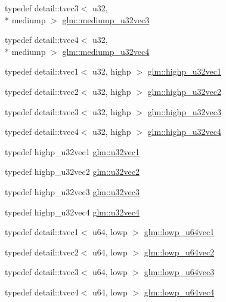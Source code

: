 \begin{DoxyCompactItemize}
\item 
typedef detail\-::tvec3$<$ u32, \\*
mediump $>$ \hyperlink{group__gtc__type__precision_ga84a903ce8834b22f78d80a64eb0181bb}{glm\-::mediump\-\_\-u32vec3}
\item 
typedef detail\-::tvec4$<$ u32, \\*
mediump $>$ \hyperlink{group__gtc__type__precision_ga532f59ac4c36a7e1371341165f7be33b}{glm\-::mediump\-\_\-u32vec4}
\item 
typedef detail\-::tvec1$<$ u32, highp $>$ \hyperlink{group__gtc__type__precision_ga8a92d1f79e2fd4a03be803e35aac8e1b}{glm\-::highp\-\_\-u32vec1}
\item 
typedef detail\-::tvec2$<$ u32, highp $>$ \hyperlink{group__gtc__type__precision_gaddb81e8e12bd640e188744ed372c95bb}{glm\-::highp\-\_\-u32vec2}
\item 
typedef detail\-::tvec3$<$ u32, highp $>$ \hyperlink{group__gtc__type__precision_gab1e386f5e415e00f800edf5d15207286}{glm\-::highp\-\_\-u32vec3}
\item 
typedef detail\-::tvec4$<$ u32, highp $>$ \hyperlink{group__gtc__type__precision_ga9418a8d549d344d4f7b7158771a2fdfe}{glm\-::highp\-\_\-u32vec4}
\item 
typedef highp\-\_\-u32vec1 \hyperlink{group__gtc__type__precision_gac8263c8c0bb36bc5c3d109f508e0fb41}{glm\-::u32vec1}
\item 
typedef highp\-\_\-u32vec2 \hyperlink{group__gtc__type__precision_gaa543e17450ca67dee12e2c41badfb3a7}{glm\-::u32vec2}
\item 
typedef highp\-\_\-u32vec3 \hyperlink{group__gtc__type__precision_ga7c88634a005904a441cba739d7cc4055}{glm\-::u32vec3}
\item 
typedef highp\-\_\-u32vec4 \hyperlink{group__gtc__type__precision_ga7e4574f8327a2f576baf2617343d0170}{glm\-::u32vec4}
\item 
typedef detail\-::tvec1$<$ u64, lowp $>$ \hyperlink{group__gtc__type__precision_gacd97dc5e92d0e2f6f6d62a5160508e2a}{glm\-::lowp\-\_\-u64vec1}
\item 
typedef detail\-::tvec2$<$ u64, lowp $>$ \hyperlink{group__gtc__type__precision_gae0e7d3ed32e8e79b4f6dd0c9baafcaea}{glm\-::lowp\-\_\-u64vec2}
\item 
typedef detail\-::tvec3$<$ u64, lowp $>$ \hyperlink{group__gtc__type__precision_gaa62794e3f055a333a85c0e52376f2429}{glm\-::lowp\-\_\-u64vec3}
\item 
typedef detail\-::tvec4$<$ u64, lowp $>$ \hyperlink{group__gtc__type__precision_ga1dc6d791a39dc52ee296a891d5b9b084}{glm\-::lowp\-\_\-u64vec4}

\end{DoxyCompactItemize}
